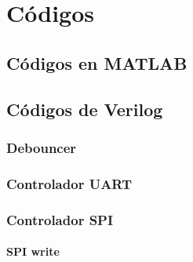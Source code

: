 \chapter{Códigos}

    \section{Códigos en MATLAB}

     

	\section{Códigos de Verilog}
	
	  \subsection{Debouncer}
	  
	  
	
	  \subsection{Controlador UART}
	
	\newpage
    
    
    \newpage
    
    
    \newpage
    
    
    \newpage
    

    \newpage
	  \subsection{Controlador SPI}

	  \subsubsection{SPI write}
    


